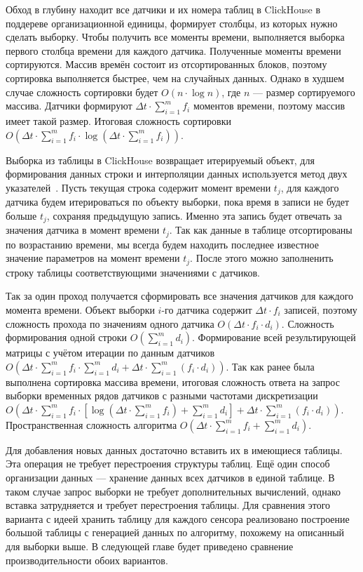 Обход в глубину находит все датчики и их номера таблиц в ClickHouse в поддереве организационной единицы, формирует столбцы, из которых нужно сделать выборку. Чтобы получить все моменты времени, выполняется выборка первого столбца времени для каждого датчика. Полученные моменты времени сортируются. Массив времён состоит из отсортированных блоков, поэтому сортировка выполняется быстрее, чем на случайных данных. Однако в худшем случае сложность сортировки будет $O(n \cdot \log{n})$, где $n$ --- размер сортируемого массива. Датчики формируют ${\Delta}t \cdot \sum^{m}_{i=1}{f_i}$ моментов времени, поэтому массив имеет такой размер. Итоговая сложность сортировки $O({\Delta}t \cdot \sum^{m}_{i=1}{f_i} \cdot \log{({\Delta}t \cdot \sum^{m}_{i=1}{f_i})})$.

Выборка из таблицы в ClickHouse возвращает итерируемый объект, для формирования данных строки и интерполяции данных используется метод двух указателей~\cite{two-pointers}. Пусть текущая строка содержит момент времени $t_j$, для каждого датчика будем итерироваться по объекту выборки, пока время в записи не будет больше $t_j$, сохраняя предыдущую запись. Именно эта запись будет отвечать за значения датчика в момент времени $t_j$. Так как данные в таблице отсортированы по возрастанию времени, мы всегда будем находить последнее известное значение параметров на момент времени $t_j$. После этого можно заполненить строку таблицы соответствующими значениями с датчиков.

Так за один проход получается сформировать все значения датчиков для каждого момента времени. Объект выборки $i$-го датчика содержит ${\Delta}t \cdot f_i$ записей, поэтому сложность прохода по значениям одного датчика $O({\Delta}t \cdot f_i \cdot d_i)$. Сложность формирования одной строки $O(\sum^{m}_{i=1}{d_i})$. Формирование всей результирующей матрицы с учётом итерации по данным датчиков $O({\Delta}t \cdot \sum^{m}_{i=1}{f_i} \cdot \sum^{m}_{i=1}{d_i} + {\Delta}t \cdot \sum^{m}_{i=1}{(f_i \cdot d_i)})$. Так как ранее была выполнена сортировка массива времени, итоговая сложность ответа на запрос выборки временных рядов датчиков с разными частотами дискретизации $O({\Delta}t \cdot \sum^{m}_{i=1}{f_i} \cdot [\log({\Delta}t \cdot \sum^{m}_{i=1}{f_i}) + \sum^{m}_{i=1}{d_i}] + {\Delta}t \cdot \sum^{m}_{i=1}{(f_i \cdot d_i)})$. Пространственная сложность алгоритма $O({\Delta}t \cdot \sum^{m}_{i=1}{f_i} + \sum^{m}_{i=1}{d_i})$.

Для добавления новых данных достаточно вставить их в имеющиеся таблицы. Эта операция не требует перестроения структуры таблиц. Ещё один способ организации данных --- хранение данных всех датчиков в единой таблице. В таком случае запрос выборки не требует дополнительных вычислений, однако вставка затрудняется и требует перестроения таблицы. Для сравнения этого варианта с идеей хранить таблицу для каждого сенсора реализовано построение большой таблицы с генерацией данных по алгоритму, похожему на описанный для выборки выше. В следующей главе будет приведено сравнение производительности обоих вариантов.